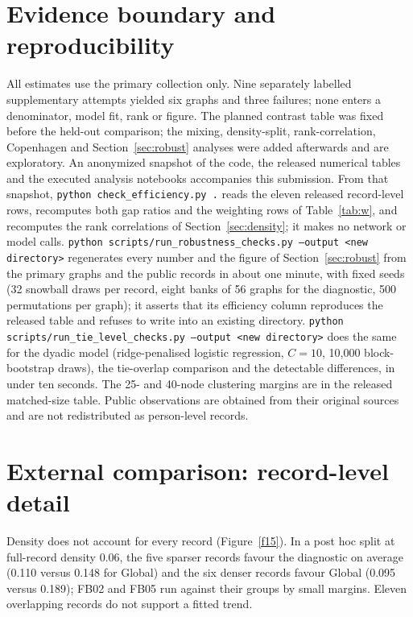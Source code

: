 \documentclass{article}
\begin{document}
\section{Evidence boundary and reproducibility}
All estimates use the primary collection only. Nine separately labelled supplementary attempts yielded six graphs and three failures; none enters a denominator, model fit, rank or figure. The planned contrast table was fixed before the held-out comparison; the mixing, density-split, rank-correlation, Copenhagen and Section~\ref{sec:robust} analyses were added afterwards and are exploratory. An anonymized snapshot of the code, the released numerical tables and the executed analysis notebooks accompanies this submission. From that snapshot, \texttt{python check\_efficiency.py .} reads the eleven released record-level rows, recomputes both gap ratios and the weighting rows of Table~\ref{tab:w}, and recomputes the rank correlations of Section~\ref{sec:density}; it makes no network or model calls. \texttt{python scripts/run\_robustness\_checks.py --output <new directory>} regenerates every number and the figure of Section~\ref{sec:robust} from the primary graphs and the public records in about one minute, with fixed seeds (32 snowball draws per record, eight banks of 56 graphs for the diagnostic, 500 permutations per graph); it asserts that its efficiency column reproduces the released table and refuses to write into an existing directory. \texttt{python scripts/run\_tie\_level\_checks.py --output <new directory>} does the same for the dyadic model (ridge-penalised logistic regression, $C=10$, 10{,}000 block-bootstrap draws), the tie-overlap comparison and the detectable differences, in under ten seconds. The 25- and 40-node clustering margins are in the released matched-size table. Public observations are obtained from their original sources and are not redistributed as person-level records.

\section{External comparison: record-level detail}\label{app:ext}
Density does not account for every record (Figure~\ref{f15}). In a post hoc split at full-record density 0.06, the five sparser records favour the diagnostic on average (0.110 versus 0.148 for Global) and the six denser records favour Global (0.095 versus 0.189); FB02 and FB05 run against their groups by small margins. Eleven overlapping records do not support a fitted trend.
\end{document}
